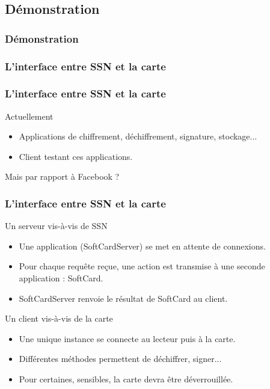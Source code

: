 \documentclass{beamer}
\begin{document}
\subsection{Démonstration}
\begin{frame}
    \frametitle{Démonstration}
    \begin{block}{}
    \end{block}
\end{frame}

\frametitle{L'interface entre SSN et la carte}
\begin{frame}
    \frametitle{L'interface entre SSN et la carte}
    \begin{block}{Actuellement}
        \begin{itemize}
            \item Applications de chiffrement, déchiffrement, signature, stockage...
            \item Client testant ces applications.
        \end{itemize}
    \end{block}

    Mais par rapport à Facebook ?
\end{frame}

\begin{frame}
    \frametitle{L'interface entre SSN et la carte}
    \begin{block}{Un serveur vis-à-vis de SSN}
        \begin{itemize}
            \item Une application (SoftCardServer) se met en
                attente de connexions.
            \item Pour chaque requête reçue, une action est transmise
                à une seconde application : SoftCard.
            \item SoftCardServer renvoie le résultat de SoftCard au client.
        \end{itemize}
    \end{block}
    \begin{block}{Un client vis-à-vis de la carte}
        \begin{itemize}
            \item Une unique instance se connecte au lecteur puis à la carte.
            \item Différentes méthodes permettent de déchiffrer, signer...
            \item Pour certaines, sensibles, la carte devra être déverrouillée.
        \end{itemize}
    \end{block}
\end{frame}
\end{document}
